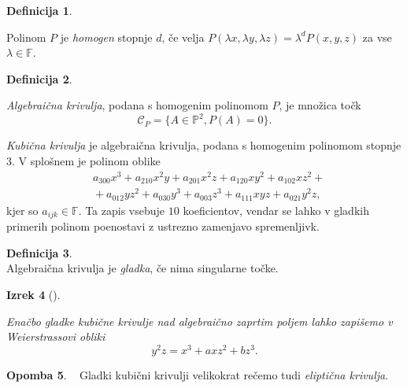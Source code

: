 \documentclass[12pt,a4paper,twoside]{article}
\theoremstyle{definition} %
\newtheorem{definicija}{Definicija}[section]
\newtheorem{opomba}[definicija]{Opomba}
\theoremstyle{plain} %
\newtheorem{izrek}[definicija]{Izrek}
\numberwithin{equation}{section}  %
\newcommand{\F}{\mathbb F}
\begin{document}
\begin{definicija}~

Polinom $P$ je \emph{homogen} stopnje $d$, če velja $P(\lambda x,\lambda y, \lambda z) = \lambda ^d P(x,y,z)$ za vse $\lambda \in \F$.
\end{definicija}

\begin{definicija}~

\emph{Algebraična krivulja}, podana s homogenim polinomom $P$, je množica točk 
$$\mathcal{C}_P= \{ A \in \mathbb{P}^2, P(A) = 0 \}.$$
\end{definicija}

\emph{Kubična krivulja} je algebraična krivulja, podana s homogenim polinomom stopnje 3. V splošnem je polinom oblike
\begin{align}
&{} a_{300}x^3+a_{210}x^2y+a_{201}x^2z+a_{120}xy^2+a_{102}xz^2+ \nonumber \\
&{}+a_{012}yz^2+a_{030}y^3+a_{003}z^3+a_{111}xyz+a_{021}y^2z, \nonumber
\end{align}
kjer so $a_{ijk} \in \F$.
Ta zapis vsebuje $10$ koeficientov, vendar se lahko v gladkih primerih polinom poenostavi z ustrezno zamenjavo spremenljivk.
\begin{definicija}~\\
Algebraična krivulja je \emph{gladka}, če nima singularne točke.
\end{definicija}

\begin{izrek}[]~

Enačbo gladke kubične krivulje nad algebraično zaprtim poljem lahko zapišemo v Weierstrassovi obliki
$$y^2z = x^3 + axz^2 + bz^3.$$
\end{izrek}


\begin{opomba}~
Gladki kubični krivulji  velikokrat rečemo tudi \emph{eliptična krivulja}.
\end{opomba}
\end{document}
